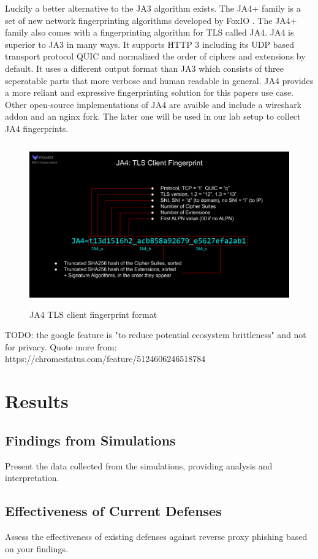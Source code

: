 \documentclass[12pt]{report}
\begin{document}
Luckily a better alternative to the JA3 algorithm exists. The JA4+ family is a set of new network fingerprinting algorithms developed by FoxIO \cite{foxIOJa4}.
The JA4+ family also comes with a fingerprinting algorithm for TLS called JA4. JA4 is superior to JA3 in many ways. It supports HTTP 3 including its UDP based transport protocol QUIC and normalized the order of ciphers and extensions by default. It uses a different output format than JA3 which consists of three seperatable parts that more verbose and human readable in general. JA4 provides a more reliant and expressive fingerprinting solution for this papers use case. Other open-source implementations of JA4 are avaible and include a wireshark addon and an nginx fork. The later one will be used in our lab setup to collect JA4 fingerprints.

\begin{figure}[!htb]
  \centering
  \includegraphics[height=7cm]{./images/JA4.png}
  \caption{JA4 TLS client fingerprint format}
\end{figure}

TODO: the google feature is "to reduce potential ecosystem brittleness" and not for privacy. Quote more from:
https://chromestatus.com/feature/5124606246518784

\chapter{Results}
\section{Findings from Simulations}
Present the data collected from the simulations, providing analysis and interpretation.

\section{Effectiveness of Current Defenses}
Assess the effectiveness of existing defenses against reverse proxy phishing based
on your findings.
\end{document}
